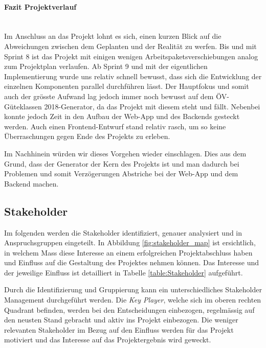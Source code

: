 \paragraph{Fazit Projektverlauf}~\\
Im Anschluss an das Projekt lohnt es sich, einen kurzen Blick auf die Abweichungen zwischen dem Geplanten und der Realität zu werfen.
Bis und mit Sprint 8 ist das Projekt mit einigen wenigen Arbeitspaketsverschiebungen analog zum Projektplan verlaufen.
Ab Sprint 9 und mit der eigentlichen Implementierung wurde uns relativ schnell bewusst, dass sich die Entwicklung der einzelnen Komponenten parallel durchführen lässt.
Der Hauptfokus und somit auch der grösste Aufwand lag jedoch immer noch bewusst auf dem \gls{ÖV-Güteklassen} 2018-Generator, da das Projekt mit diesem steht und fällt.
Nebenbei konnte jedoch Zeit in den Aufbau der Web-App und des Backends gesteckt werden.
Auch einen Frontend-Entwurf stand relativ rasch, um so keine Überraschungen gegen Ende des Projekts zu erleben.

Im Nachhinein würden wir dieses Vorgehen wieder einschlagen.
Dies aus dem Grund, dass der Generator der Kern des Projekts ist und man dadurch bei Problemen und somit Verzögerungen Abstriche bei der Web-App und dem Backend machen.

\subsection{Stakeholder}
\label{Projektmanagement:Stakeholder}

Im folgenden werden die Stakeholder identifiziert, genauer analysiert und in Anspruchsgruppen eingeteilt.
In Abbildung \ref{fig:stakeholder_map} ist ersichtlich, in welchem Mass diese Interesse an einem erfolgreichen Projektabschluss haben und Einfluss auf die Gestaltung des Projektes nehmen können. 
Das Interesse und der jeweilige Einfluss ist detailliert in Tabelle \ref{table:Stakeholder} aufgeführt.

Durch die Identifizierung und Gruppierung kann ein unterschiedliches Stakeholder Management durchgeführt werden. 
Die \emph{Key Player}, welche sich im oberen rechten Quadrant befinden, werden bei den Entscheidungen einbezogen, regelmässig auf den neusten Stand gebracht und aktiv ins Projekt einbezogen.
Die weniger relevanten Stakeholder im Bezug auf den Einfluss werden für das Projekt motiviert und das Interesse auf das Projektergebnis wird geweckt.

